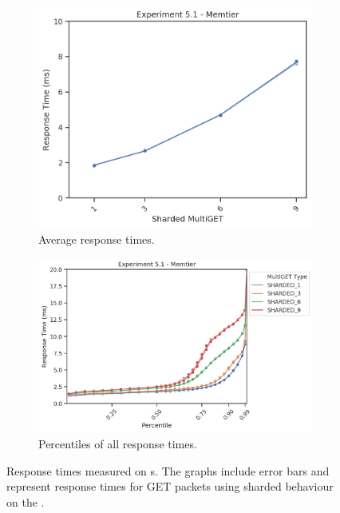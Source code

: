         \begin{figure}
            \vspace*{-.5\baselineskip}
                \centering
            \begin{subfigure}[t!]{0.43\textwidth}
                \centering
                \includegraphics[width=\textwidth]{../data_analysis/figures/5-1_mt_response-time.png}
                \caption{Average response times.\label{fig:shard_mt_rt}}
            \end{subfigure}
            \begin{subfigure}[t!]{0.56\textwidth}
                \centering
                \includegraphics[width=\textwidth]{../data_analysis/figures/5-1_mt_percentiles.png}
                \caption{Percentiles of all response times.\label{fig:shard_mt_rt_percentiles}}
            \end{subfigure}
            \caption{Response times measured on \cli{}s. The graphs include error bars and represent response times
            for GET packets using sharded behaviour on the \mw.\label{fig:shard_mt}}
        \end{figure}

